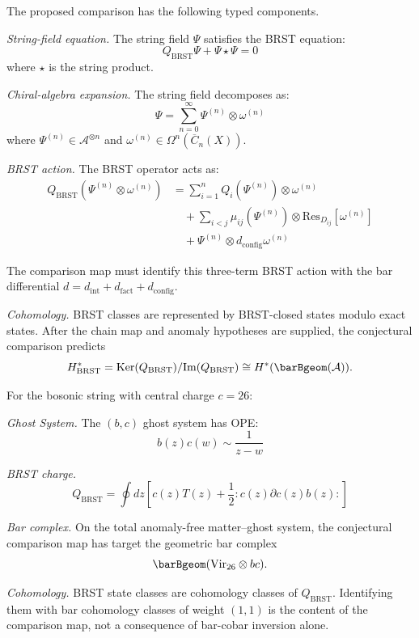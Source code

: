 \begin{remark}
The proposed comparison has the following typed components.

\emph{String-field equation.} The string field $\Psi$ satisfies the BRST equation:
\[Q_{\text{BRST}} \Psi + \Psi \star \Psi = 0\]
where $\star$ is the string product.

\emph{Chiral-algebra expansion.} The string field decomposes as:
\[\Psi = \sum_{n=0}^\infty \Psi^{(n)} \otimes \omega^{(n)}\]
where $\Psi^{(n)} \in \mathcal{A}^{\otimes n}$ and $\omega^{(n)} \in \Omega^n(\overline{C}_n(X))$.

\emph{BRST action.} The BRST operator acts as:
\begin{align}
Q_{\text{BRST}}(\Psi^{(n)} \otimes \omega^{(n)}) &= \sum_{i=1}^n Q_i(\Psi^{(n)}) \otimes \omega^{(n)} \\
&\quad + \sum_{i<j} \mu_{ij}(\Psi^{(n)}) \otimes \text{Res}_{D_{ij}}[\omega^{(n)}] \\
&\quad + \Psi^{(n)} \otimes d_{\text{config}}\omega^{(n)}
\end{align}

The comparison map must identify this three-term BRST action with the
bar differential
$d = d_{\text{int}} + d_{\text{fact}} + d_{\text{config}}$.

\emph{Cohomology.} BRST classes are represented by
BRST-closed states modulo exact states. After the chain map and anomaly
hypotheses are supplied, the conjectural comparison predicts
\[
H^*_{\text{BRST}}
=
\text{Ker}(Q_{\text{BRST}})/\text{Im}(Q_{\text{BRST}})
\cong
H^*(\barBgeom(\mathcal{A})).
\]
\end{remark}

\begin{example}
For the bosonic string with central charge $c = 26$:

\emph{Ghost System.} The $(b,c)$ ghost system has OPE:
\[b(z)c(w) \sim \frac{1}{z-w}\]

\emph{BRST charge.}
\[Q_{\text{BRST}} = \oint dz \left[ c(z)T(z) + \frac{1}{2}:c(z)\partial c(z)b(z): \right]\]

\emph{Bar complex.} On the total anomaly-free matter--ghost system,
the conjectural comparison map has target the geometric bar complex
\[
\barBgeom(\mathrm{Vir}_{26}\otimes bc).
\]

\emph{Cohomology.} BRST state classes are cohomology classes of
$Q_{\text{BRST}}$. Identifying them with bar cohomology classes of weight
\((1,1)\) is the content of the comparison map, not a consequence of
bar-cobar inversion alone.
\end{example}


